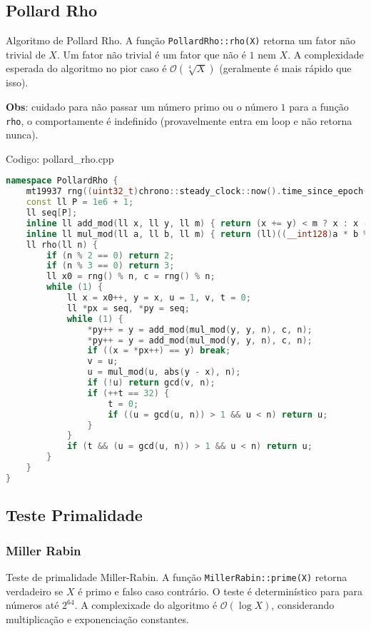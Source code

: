 \documentclass[10pt, a4paper, oneside]{book}
\begin{document}
\subsection{Pollard Rho}


Algoritmo de Pollard Rho. A função \texttt{PollardRho::rho(X)} retorna um fator não trivial de $X$. Um fator não trivial é um fator que não é $1$ nem $X$. A complexidade esperada do algoritmo no pior caso é $\mathcal{O}(\sqrt[4]{X})$ (geralmente é mais rápido que isso).



\textbf{Obs}: cuidado para não passar um número primo ou o número $1$ para a função \texttt{rho}, o comportamente é indefinido (provavelmente entra em loop e não retorna nunca).

\hfill

Codigo: pollard\_rho.cpp

\begin{lstlisting}[language=C++]
namespace PollardRho {
    mt19937 rng((uint32_t)chrono::steady_clock::now().time_since_epoch().count());
    const ll P = 1e6 + 1;
    ll seq[P];
    inline ll add_mod(ll x, ll y, ll m) { return (x += y) < m ? x : x - m; }
    inline ll mul_mod(ll a, ll b, ll m) { return (ll)((__int128)a * b % m); }
    ll rho(ll n) {
        if (n % 2 == 0) return 2;
        if (n % 3 == 0) return 3;
        ll x0 = rng() % n, c = rng() % n;
        while (1) {
            ll x = x0++, y = x, u = 1, v, t = 0;
            ll *px = seq, *py = seq;
            while (1) {
                *py++ = y = add_mod(mul_mod(y, y, n), c, n);
                *py++ = y = add_mod(mul_mod(y, y, n), c, n);
                if ((x = *px++) == y) break;
                v = u;
                u = mul_mod(u, abs(y - x), n);
                if (!u) return gcd(v, n);
                if (++t == 32) {
                    t = 0;
                    if ((u = gcd(u, n)) > 1 && u < n) return u;
                }
            }
            if (t && (u = gcd(u, n)) > 1 && u < n) return u;
        }
    }
}\end{lstlisting}
\hfill

\subsection{Teste Primalidade}
\subsubsection{Miller Rabin}


Teste de primalidade Miller-Rabin. A função \texttt{MillerRabin::prime(X)} retorna verdadeiro se $X$ é primo e falso caso contrário. O teste é determinístico para para números até $2^{64}$. A complexixade do algoritmo é $\mathcal{O}(\log X)$, considerando multiplicação e exponenciação constantes.
\end{document}
